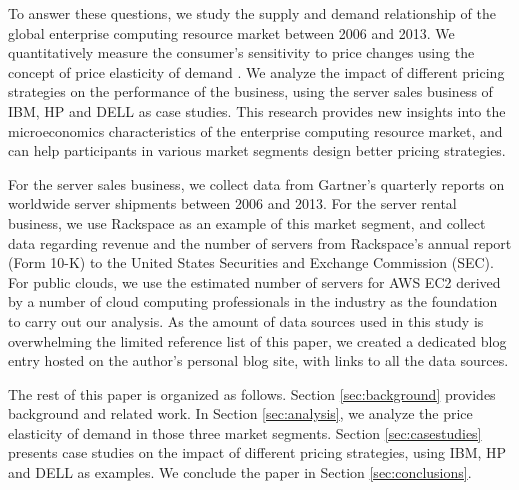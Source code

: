 \documentclass[10pt,journal,cspaper,compsoc]{IEEEtran}
\begin{document}
To answer these questions, we study the supply and demand relationship of the global enterprise computing resource market between 2006 and 2013. We quantitatively measure the consumer's sensitivity to price changes using the concept of price elasticity of demand \cite{marshall}. We analyze the impact of different pricing strategies on the performance of the business, using the server sales business of IBM, HP and DELL as case studies. This research provides new insights into the microeconomics characteristics of the enterprise computing resource market, and can help participants in various market segments design better pricing strategies.

For the server sales business, we collect data from Gartner's quarterly reports on worldwide server shipments between 2006 and 2013. For the server rental business, we use Rackspace as an example of this market segment, and collect data regarding revenue and the number of servers from Rackspace's annual report (Form 10-K) to the United States Securities and Exchange Commission (SEC). For public clouds, we use the estimated number of servers for AWS EC2 derived by a number of cloud computing professionals in the industry as the foundation to carry out our analysis. As the amount of data sources used in this study is overwhelming the limited reference list of this paper, we created a dedicated blog entry \cite{qyjohn} hosted on the author's personal blog site, with links to all the data sources. 

The rest of this paper is organized as follows. Section \ref{sec:background} provides background and related work. In Section \ref{sec:analysis}, we analyze the price elasticity of demand in those three market segments. Section \ref{sec:casestudies} presents case studies on the impact of different pricing strategies, using IBM, HP and DELL as examples. We conclude the paper in Section \ref{sec:conclusions}.
\end{document}
